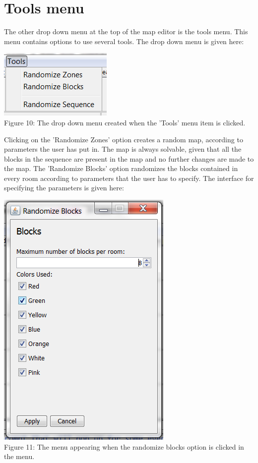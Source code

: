 \documentclass[]{article}
\begin{document}
\section*{Tools menu}
The other drop down menu at the top of the map editor is the tools menu. This menu contains options to use several tools. The drop down menu is given here:
\begin{center}
	\centering
	\includegraphics{DropDownTools.png}\\
	Figure 10: The drop down menu created when the 'Tools' menu item is clicked.
\end{center}
Clicking on the 'Randomize Zones' option creates a random map, according to parameters the user has put in. The map is always solvable, given that all the blocks in the sequence are present in the map and no further changes are made to the map. The 'Randomize Blocks' option randomizes the blocks contained in every room according to parameters that the user has to specify. The interface for specifying the parameters is given here:
\begin{center}
	\centering
	\includegraphics[scale=0.6]{MenuBlocks.png}\\
	Figure 11: The menu appearing when the randomize blocks option is clicked in the menu.
\end{center}
\end{document}
